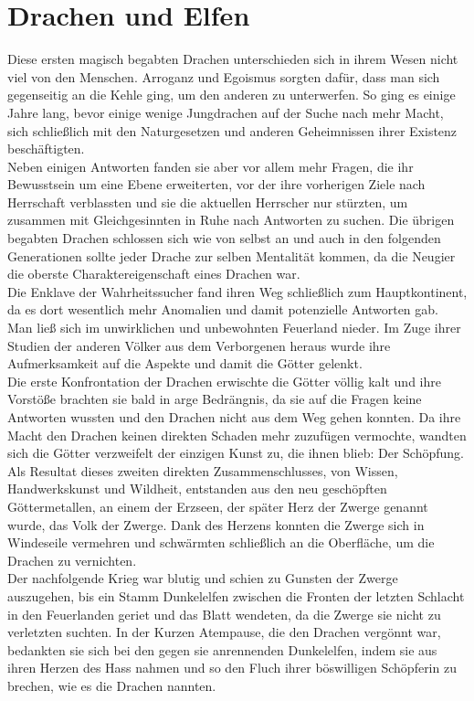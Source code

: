 \documentclass[a4paper,12pt,oneside]{book}
\begin{document}
\section{Drachen und Elfen}
Diese ersten magisch begabten Drachen unterschieden sich in ihrem Wesen nicht viel von den Menschen. Arroganz und Egoismus sorgten dafür, dass man sich gegenseitig an die Kehle ging, um den anderen zu unterwerfen. So ging es einige Jahre lang, bevor einige wenige Jungdrachen auf der Suche nach mehr Macht, sich schließlich mit den Naturgesetzen und anderen Geheimnissen ihrer Existenz beschäftigten.
\\Neben einigen Antworten fanden sie aber vor allem mehr Fragen, die ihr Bewusstsein um eine Ebene erweiterten, vor der ihre vorherigen Ziele nach Herrschaft verblassten und sie die aktuellen Herrscher nur stürzten, um zusammen mit Gleichgesinnten in Ruhe nach Antworten zu suchen. Die übrigen begabten Drachen schlossen sich wie von selbst an und auch in den folgenden Generationen sollte jeder Drache zur selben Mentalität kommen, da die Neugier die oberste Charaktereigenschaft eines Drachen war.
\\Die Enklave der Wahrheitssucher fand ihren Weg schließlich zum Hauptkontinent, da es dort wesentlich mehr Anomalien und damit potenzielle Antworten gab. Man ließ sich im unwirklichen und unbewohnten Feuerland nieder. Im Zuge ihrer Studien der anderen Völker aus dem Verborgenen heraus wurde ihre Aufmerksamkeit auf die Aspekte und damit die Götter gelenkt.
\\Die erste Konfrontation der Drachen erwischte die Götter völlig kalt und ihre Vorstöße brachten sie bald in arge Bedrängnis, da sie auf die Fragen keine Antworten wussten und den Drachen nicht aus dem Weg gehen konnten. Da ihre Macht den Drachen keinen direkten Schaden mehr zuzufügen vermochte, wandten sich die Götter verzweifelt der einzigen Kunst zu, die ihnen blieb: Der Schöpfung.
\\Als Resultat dieses zweiten direkten Zusammenschlusses, von Wissen, Handwerkskunst und Wildheit, entstanden aus den neu geschöpften Göttermetallen, an einem der Erzseen, der später Herz der Zwerge genannt wurde, das Volk der Zwerge. Dank des Herzens konnten die Zwerge sich in Windeseile vermehren und schwärmten schließlich an die Oberfläche, um die Drachen zu vernichten.
\\Der nachfolgende Krieg war blutig und schien zu Gunsten der Zwerge auszugehen, bis ein Stamm Dunkelelfen zwischen die Fronten der letzten Schlacht in den Feuerlanden geriet und das Blatt wendeten, da die Zwerge sie nicht zu verletzten suchten. In der Kurzen Atempause, die den Drachen vergönnt war, bedankten sie sich bei den gegen sie anrennenden Dunkelelfen, indem sie aus ihren Herzen des Hass nahmen und so den Fluch ihrer böswilligen Schöpferin zu brechen, wie es die Drachen nannten.
\end{document}
